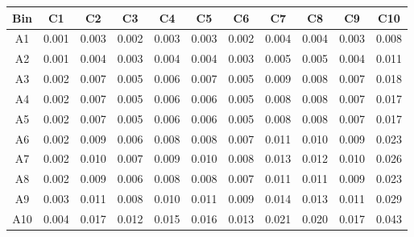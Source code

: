 \begin{tabular}{c@{~~~}c@{~~}c@{~~}c@{~~}c@{~~}c@{~~}c@{~~}c@{~~}c@{~~}c@{~~}c}
\hline 
 \hline 
Bin	& C1 & C2 & C3 & C4 & C5 & C6 & C7 & C8 & C9 & C10 \\ 
\hline 
A1	&  0.001 &  0.003 &  0.002 &  0.003 &  0.003 &  0.002 &  0.004 &  0.004 &  0.003 &  0.008 \\  
A2	&  0.001 &  0.004 &  0.003 &  0.004 &  0.004 &  0.003 &  0.005 &  0.005 &  0.004 &  0.011 \\  
A3	&  0.002 &  0.007 &  0.005 &  0.006 &  0.007 &  0.005 &  0.009 &  0.008 &  0.007 &  0.018 \\  
A4	&  0.002 &  0.007 &  0.005 &  0.006 &  0.006 &  0.005 &  0.008 &  0.008 &  0.007 &  0.017 \\  
A5	&  0.002 &  0.007 &  0.005 &  0.006 &  0.006 &  0.005 &  0.008 &  0.008 &  0.007 &  0.017 \\  
A6	&  0.002 &  0.009 &  0.006 &  0.008 &  0.008 &  0.007 &  0.011 &  0.010 &  0.009 &  0.023 \\  
A7	&  0.002 &  0.010 &  0.007 &  0.009 &  0.010 &  0.008 &  0.013 &  0.012 &  0.010 &  0.026 \\  
A8	&  0.002 &  0.009 &  0.006 &  0.008 &  0.008 &  0.007 &  0.011 &  0.011 &  0.009 &  0.023 \\  
A9	&  0.003 &  0.011 &  0.008 &  0.010 &  0.011 &  0.009 &  0.014 &  0.013 &  0.011 &  0.029 \\  
A10	&  0.004 &  0.017 &  0.012 &  0.015 &  0.016 &  0.013 &  0.021 &  0.020 &  0.017 &  0.043 \\  
\hline 
 \hline 
\end{tabular}